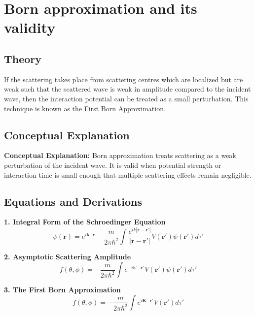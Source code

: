 \documentclass[12pt]{report}
\begin{document}
\section{Born approximation and its validity}



\subsection*{Theory}
If the scattering takes place from scattering centres which are localized but are weak such that the scattered wave is weak in amplitude compared to the incident wave, then the interaction potential can be treated as a small perturbation. This technique is known as the First Born Approximation.


\subsection{Conceptual Explanation}
\textbf{Conceptual Explanation:} Born approximation treats scattering as a weak perturbation of the incident wave. It is valid when potential strength or interaction time is small enough that multiple scattering effects remain negligible.


\begin{figure}[H]
    
\end{figure}

\subsection*{Equations and Derivations}

\textbf{1. Integral Form of the Schroedinger Equation}
\begin{equation}
\psi(\mathbf{r}) = e^{i\mathbf{k}\cdot\mathbf{r}} - \frac{m}{2\pi\hbar^2} \int \frac{e^{ik|\mathbf{r}-\mathbf{r}'|}}{|\mathbf{r}-\mathbf{r}'|} V(\mathbf{r}') \psi(\mathbf{r}') d\tau'
\end{equation}

\textbf{2. Asymptotic Scattering Amplitude}
\begin{equation}
f(\theta, \phi) = -\frac{m}{2\pi\hbar^2} \int e^{-i\mathbf{k}'\cdot\mathbf{r}'} V(\mathbf{r}') \psi(\mathbf{r}') d\tau'
\end{equation}

\textbf{3. The First Born Approximation}
\begin{equation}
f(\theta, \phi) = -\frac{m}{2\pi\hbar^2} \int e^{i\mathbf{K}\cdot\mathbf{r}'} V(\mathbf{r}') d\tau'
\end{equation}
\end{document}
